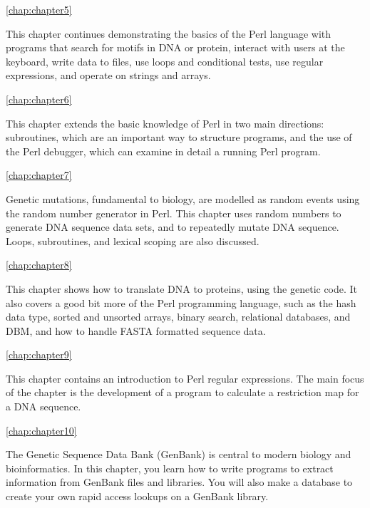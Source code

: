 \autoref{chap:chapter5}
\begin{adjustwidth}{2em}{0cm}
This chapter continues demonstrating the basics of the Perl language with programs that search for motifs in DNA or protein, interact with users at the keyboard, write data to files, use loops and conditional tests, use regular expressions, and operate on strings and arrays.
\end{adjustwidth}

\autoref{chap:chapter6}
\begin{adjustwidth}{2em}{0cm}
This chapter extends the basic knowledge of Perl in two main directions: subroutines, which are an important way to structure programs, and the use of the Perl debugger, which can examine in detail a running Perl program.
\end{adjustwidth}

\autoref{chap:chapter7}
\begin{adjustwidth}{2em}{0cm}
Genetic mutations, fundamental to biology, are modelled as random events using the random number generator in Perl. This chapter uses random numbers to generate DNA sequence data sets, and to repeatedly mutate DNA sequence. Loops, subroutines, and lexical scoping are also discussed.
\end{adjustwidth}

\autoref{chap:chapter8}
\begin{adjustwidth}{2em}{0cm}
This chapter shows how to translate DNA to proteins, using the genetic code. It also covers a good bit more of the Perl programming language, such as the hash data type, sorted and unsorted arrays, binary search, relational databases, and DBM, and how to handle FASTA formatted sequence data.
\end{adjustwidth}

\autoref{chap:chapter9}
\begin{adjustwidth}{2em}{0cm}
This chapter contains an introduction to Perl regular expressions. The main focus of the chapter is the development of a program to calculate a restriction map for a DNA sequence.
\end{adjustwidth}

\autoref{chap:chapter10}
\begin{adjustwidth}{2em}{0cm}
The Genetic Sequence Data Bank (GenBank) is central to modern biology and bioinformatics. In this chapter, you learn how to write programs to extract information from GenBank files and libraries. You will also make a database to create your own rapid access lookups on a GenBank library.
\end{adjustwidth}


